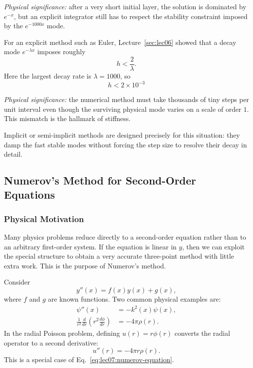\textit{Physical significance:} after a very short initial layer, the
solution is dominated by $e^{-x}$, but an explicit integrator still has to
respect the stability constraint imposed by the $e^{-1000x}$ mode.

For an explicit method such as Euler, Lecture~\ref{sec:lec06} showed that a
decay mode $e^{-\lambda x}$ imposes roughly
\begin{equation}
    h<\frac{2}{\lambda}.
    \label{eq:lec07:euler-mode-stability}
\end{equation}
Here the largest decay rate is $\lambda=1000$, so
\begin{equation}
    \boxed{h<2\times 10^{-3}}
    \label{eq:lec07:stiff-step-restriction}
\end{equation}

\textit{Physical significance:} the numerical method must take thousands of
tiny steps per unit interval even though the surviving physical mode varies
on a scale of order $1$. This mismatch is the hallmark of stiffness.

Implicit or semi-implicit methods are designed precisely for this situation:
they damp the fast stable modes without forcing the step size to resolve
their decay in detail.

\subsection{Numerov's Method for Second-Order Equations}
\label{subsec:lec07:numerov}

\subsubsection*{Physical Motivation}
Many physics problems reduce directly to a second-order equation rather than
to an arbitrary first-order system. If the equation is linear in $y$, then
we can exploit the special structure to obtain a very accurate three-point
method with little extra work. This is the purpose of Numerov's method.

Consider
\begin{equation}
    y''(x)=f(x)y(x)+g(x),
    \label{eq:lec07:numerov-equation}
\end{equation}
where $f$ and $g$ are known functions. Two common physical examples are:
\begin{align}
    \psi''(x) &= -k^2(x)\psi(x),
    \label{eq:lec07:wave-example}\\
    \frac{1}{r^2}\frac{d}{dr}
    \left(r^2\frac{d\phi}{dr}\right)
    &= -4\pi\rho(r).
    \label{eq:lec07:poisson-radial}
\end{align}
In the radial Poisson problem, defining $u(r)=r\phi(r)$ converts the radial
operator to a second derivative:
\begin{equation}
    u''(r)=-4\pi r\rho(r).
    \label{eq:lec07:poisson-u}
\end{equation}
This is a special case of Eq.~\eqref{eq:lec07:numerov-equation}.

